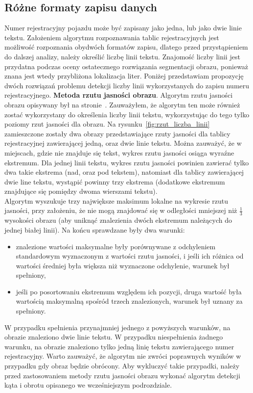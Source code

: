 \subsection{Różne formaty zapisu danych}\label{ssec:different_formats}
Numer rejestracyjny pojazdu może być zapisany jako jedna, lub jako dwie linie tekstu. Założeniem algorytmu rozpoznawania tablic rejestracyjnych jest możliwość rozpoznania obydwóch formatów zapisu, dlatego przed przystąpieniem do dalszej analizy, należy określić liczbę linii tekstu. Znajomość liczby linii jest przydatna podczas oceny ostatecznego rozwiązania segmentacji obrazu, ponieważ znana jest wtedy przybliżona lokalizacja liter. Poniżej przedstawiam propozycję dwóch rozwiązań problemu detekcji liczby linii wykorzystanych do zapisu numeru rejestracyjnego.
\textbf{Metoda rzutu jasności obrazu}. Algorytm rzutu jasności obrazu opisywany był na stronie~\pageref{ssec:rzut_jasnosci}. Zauważyłem, że algorytm ten może również zostać wykorzystany do określenia liczby linii tekstu, wykorzystując do tego tylko poziomy rzut jasności dla obrazu. Na rysunku~\ref{fig:rzut_liczba_linii} zamieszczone zostały dwa obrazy przedstawiające rzuty jasności dla tablicy rejestracyjnej zawierającej jedną, oraz dwie linie tekstu. Można zauważyć, że w miejscach, gdzie nie znajduje się tekst, wykres rzutu jasności osiąga wyraźne ekstremum. Dla jednej linii tekstu, wykres rzutu jasności powinien zawierać tylko dwa takie ekstrema (nad, oraz pod tekstem), natomiast dla tablicy zawierającej dwie line tekstu, wystąpić powinny trzy ekstrema (dodatkowe ekstremum znajdujące się pomiędzy dwoma wierszami tekstu).\\
Algorytm wyszukuje trzy największe maksimum lokalne na wykresie rzutu jasności, przy założeniu, że nie mogą znajdować się w odległości mniejszej niż $\frac{1}{3}$ wysokości obrazu (aby uniknąć znalezienia dwóch ekstremum należących do jednej białej linii). Na końcu sprawdzane były dwa warunki:
\begin{itemize}
  \item znalezione wartości maksymalne były porównywane z odchyleniem standardowym wyznaczonym z wartości rzutu jasności, i jeśli ich różnica od wartości średniej była większa niż wyznaczone odchylenie, warunek był spełniony,
  \item jeśli po posortowaniu ekstremum względem ich pozycji, druga wartość była wartością maksymalną spośród trzech znalezionych, warunek był uznany za spełniony.
\end{itemize}
W przypadku spełnienia przynajmniej jednego z powyższych warunków, na obrazie znaleziono dwie linie tekstu. W przypadku niespełnienia żadnego warunku, na obrazie znaleziono tylko jedną linię tekstu zawierającego numer rejestracyjny. Warto zauważyć, że algorytm nie zwróci poprawnych wyników w przypadku gdy obraz będzie obrócony. Aby wykluczyć takie przypadki, należy przed zastosowaniem metody rzutu jasności obrazu wykonać algorytm detekcji kąta i obrotu opisanego we wcześniejszym podrozdziale.


